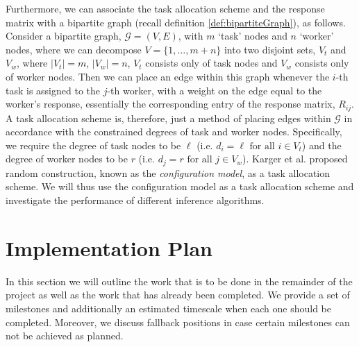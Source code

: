 \documentclass[12pt]{article}
\numberwithin{equation}{section}
\begin{document}
Furthermore, we can associate the task allocation scheme and the response matrix with a bipartite graph (recall definition \ref{def:bipartiteGraph}), as follows. Consider a bipartite graph, $\mathcal{G} = (V,E)$, with $m$ `task' nodes and $n$ `worker' nodes, where we can decompose $V=\{1,\dots,m+n\}$ into two disjoint sets, $V_{t}$ and $V_{w}$, where $\left\vert{V_{t}}\right\vert = m$, $\left\vert{V_{w}}\right\vert = n$, $V_{t}$ consists only of task nodes and $V_{w}$ consists only of worker nodes. Then we can place an edge within this graph whenever the $i$-th task is assigned to the $j$-th worker, with a weight on the edge equal to the worker's response, essentially the corresponding entry of the response matrix, $R_{ij}$. A task allocation scheme is, therefore, just a method of placing edges within $\mathcal{G}$ in accordance with the constrained degrees of task and worker nodes. Specifically, we require the degree of task nodes to be $\ell$ (i.e. $d_{i} = \ell \text{ for all } i \in V_{t}$) and the degree of worker nodes to be $r$ (i.e. $d_{j} = r \text{ for all } j \in V_{w}$). Karger et al. \cite{KOS13} proposed random construction, known as the \textit{configuration model}, as a task allocation scheme. We will thus use the configuration model as a task allocation scheme and investigate the performance of different inference algorithms.


\newpage
\thispagestyle{plain}
\mbox{}
\section {Implementation Plan}
\label{sec:implementationPlan}

In this section we will outline the work that is to be done in the remainder of the project as well as the work that has already been completed. We provide a set of milestones and additionally an estimated timescale when each one should be completed. Moreover, we discuss fallback positions in case certain milestones can not be achieved as planned.
\end{document}
